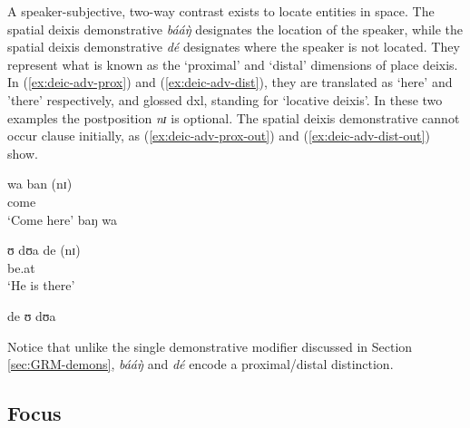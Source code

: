 \begin{exe}
\begin{exe}
\begin{exe}
{\begin{exe}
\begin{exe}
\begin{exe}
\begin{exe}
\begin{exe}
\begin{exe}
\begin{exe}
\begin{xlist}
\begin{exe}
\begin{exe}
\begin{exe}
\begin{exe}
\begin{exe}
\begin{exe}
\begin{exe}
\begin{exe}
\begin{exe}
\begin{exe}
\begin{exe}
\begin{exe}
\begin{exe}
\begin{exe}
\begin{exe}
A speaker-subjective,  two-way contrast  exists to locate entities in space. 
The spatial deixis demonstrative  {\it bááŋ̀} designates the location of the 
speaker, while 
the spatial deixis demonstrative  {\it dé} designates  where the
speaker is not located. They represent what is known as the `proximal' and
`distal' 
dimensions of  place deixis. In (\ref{ex:deic-adv-prox}) and
(\ref{ex:deic-adv-dist}),  they are translated as `here' and 'there'
respectively, and glossed {\sc dxl}, standing for `locative deixis'. In these
two examples  the postposition {\it nɪ} is optional.  The  spatial deixis 
demonstrative cannot occur clause initially, as  (\ref{ex:deic-adv-prox-out})  
and  (\ref{ex:deic-adv-dist-out}) show. 


\ea\label{ex:vp}


\ea\label{ex:deic-adv-prox}
\gll wa ban (nɪ)\\
     come {\dem} {\postp} \\
\glt  `Come here'
\ex\label{ex:deic-adv-prox-out}
\textasteriskcentered baŋ wa 

 \ex\label{ex:deic-adv-dist}
\gll ʊ  dʊa de (nɪ) \\
       {\psg}  be.at  {\dem}  {\postp}\\
\glt  `He is there'

\ex\label{ex:deic-adv-dist-out}
\textasteriskcentered de ʊ  dʊa 

\z 
 \z

Notice that unlike the single demonstrative  modifier discussed in Section 
\ref{sec:GRM-demons},   {\it bááŋ̀} and   {\it dé} 
encode a proximal/distal distinction.



\subsection{Focus}
\label{sec:GRM-focus}


\end{exe}
\end{exe}
\end{exe}
\end{exe}
\end{exe}
\end{exe}
\end{exe}
\end{exe}
\end{exe}
\end{exe}
\end{exe}
\end{exe}
\end{exe}
\end{exe}
\end{exe}
\end{xlist}
\end{exe}
\end{exe}
\end{exe}
\end{exe}
\end{exe}
\end{exe}
\end{exe}}
\end{exe}
\end{exe}
\end{exe}
